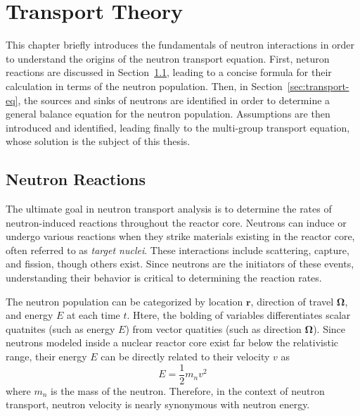 \chapter{Transport Theory}
\label{chap:transport}

This chapter briefly introduces the fundamentals of neutron interactions in order to understand the origins of the neutron transport equation. First, neturon reactions are discussed in Section~\ref{sec:transport-fundamentals}, leading to a concise formula for their calculation in terms of the neutron population. Then, in Section~\ref{sec:transport-eq}, the sources and sinks of neutrons are identified in order to determine a general balance equation for the neutron population. Assumptions are then introduced and identified, leading finally to the multi-group transport equation, whose solution is the subject of this thesis.

\section{Neutron Reactions}
\label{sec:transport-fundamentals}

The ultimate goal in neutron transport analysis is to determine the rates of neutron-induced reactions throughout the reactor core. Neutrons can induce or undergo various reactions when they strike materials existing in the reactor core, often referred to as \textit{target nuclei}. These interactions include scattering, capture, and fission, though others exist. Since neutrons are the initiators of these events, understanding their behavior is critical to determining the reaction rates.

The neutron population can be categorized by location $\mathbf{r}$, direction of travel $\mathbf{\Omega}$, and energy $E$ at each time $t$. Htere, the bolding of variables differentiates scalar quatnites (such as energy $E$) from vector quatities (such as direction $\mathbf{\Omega}$). Since neutrons modeled inside a nuclear reactor core exist far below the relativistic range, their energy $E$ can be directly related to their velocity $v$ as
\begin{equation}
E = \frac{1}{2} m_n v^2
\end{equation}
where $m_n$ is the mass of the neutron. Therefore, in the context of neutron transport, neutron velocity is nearly synonymous with neutron energy.

